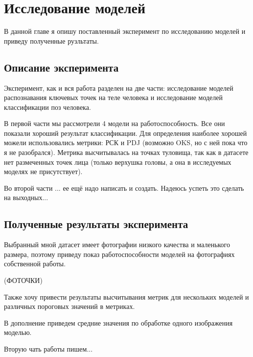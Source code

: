 \section{Исследование моделей}
\label{sec:Chapter4} 

В данной главе я опишу поставленный эксперимент по исследованию моделей и приведу полученные рузльтаты.

\subsection{Описание эксперимента}

Эксперимент, как и вся работа разделен на две части: исследование моделей распознавания ключевых точек на теле человека и исследование моделей классификации поз человека.

В первой части мы рассмотрели 4 модели на работоспособность. Все они показали хороший результат классификации. Для определения наиболее хорошей можели использовались метрики: РСК и PDJ (возможно OKS, но с ней пока что я не разобрался). Метрика высчитывалась на точках туловища, так как в датасете нет размеченных точек лица (только верхушка головы, а она в исследуемых моделях не присутствует).

Во второй части ... ее ещё надо написать и создать. Надеюсь успеть это сделать на выходных...

\subsection{Полученные результаты эксперимента}

Выбранный мной датасет имеет фотографии низкого качества и маленького размера, поэтому приведу показ работоспособности моделей на фотографиях собственной работы. 

(ФОТОЧКИ)

Также хочу привести результаты высчитывания метрик для нескольких моделей и различных пороговых значений в метриках.

В дополнение приведем средние значения по обработке одного изображения моделью.

Вторую чать работы пишем...

\newpage